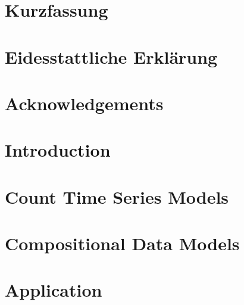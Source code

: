 \documentclass[a4paper,twoside,12pt,appendixprefix=true,bibliography=totoc,listof=totoc]{scrbook}
\begin{document}
\pagestyle{empty} %

\pagestyle{plain} %

\onehalfspacing    %


\chapter*{Kurzfassung}

\chapter*{Eidesstattliche Erklärung}

\chapter*{Acknowledgements}

\tableofcontents %
\cleardoublepage %

\chapter{Introduction}
\label{sec:Introduction}


\chapter{Count Time Series Models}
\label{sec:CountTS}

\chapter{Compositional Data Models}
\label{sec:Coda}



\chapter{Application}
\label{sec:Application}





\end{document}
